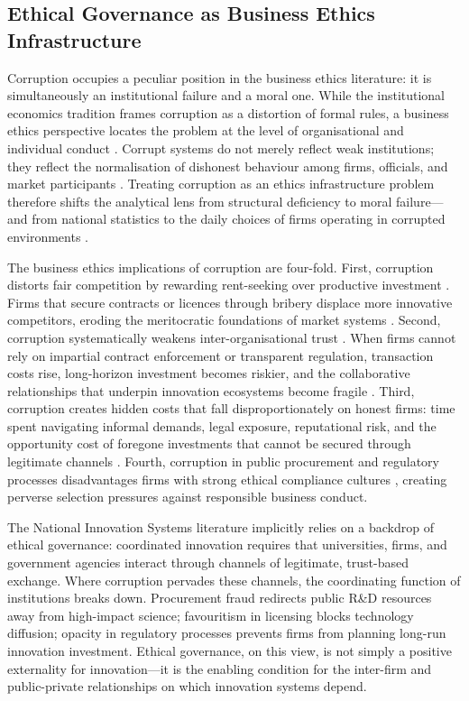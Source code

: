 \documentclass[pdflatex,sn-apa]{sn-jnl}
\begin{document}
\subsection{Ethical Governance as Business Ethics Infrastructure}

Corruption occupies a peculiar position in the business ethics literature: it is simultaneously an institutional failure and a moral one. While the institutional economics tradition \citep{north1990} frames corruption as a distortion of formal rules, a business ethics perspective locates the problem at the level of organisational and individual conduct \citep{freeman1984,donaldson1994}. Corrupt systems do not merely reflect weak institutions; they reflect the normalisation of dishonest behaviour among firms, officials, and market participants \citep{trevino2006,paine1994}. Treating corruption as an ethics infrastructure problem therefore shifts the analytical lens from structural deficiency to moral failure---and from national statistics to the daily choices of firms operating in corrupted environments \citep{argandona2001}.

The business ethics implications of corruption are four-fold. First, corruption distorts fair competition by rewarding rent-seeking over productive investment \citep{mauro1995,meon2005}. Firms that secure contracts or licences through bribery displace more innovative competitors, eroding the meritocratic foundations of market systems \citep{freeman1984,argandona2001}. Second, corruption systematically weakens inter-organisational trust \citep{north1990,scott2001}. When firms cannot rely on impartial contract enforcement or transparent regulation, transaction costs rise, long-horizon investment becomes riskier, and the collaborative relationships that underpin innovation ecosystems become fragile \citep{donaldson1994}. Third, corruption creates hidden costs that fall disproportionately on honest firms: time spent navigating informal demands, legal exposure, reputational risk, and the opportunity cost of foregone investments that cannot be secured through legitimate channels \citep{paine1994}. Fourth, corruption in public procurement and regulatory processes disadvantages firms with strong ethical compliance cultures \citep{trevino2006,kaptein2008}, creating perverse selection pressures against responsible business conduct.

The National Innovation Systems literature \citep{freeman1987,lundvall1992,nelson1993} implicitly relies on a backdrop of ethical governance: coordinated innovation requires that universities, firms, and government agencies interact through channels of legitimate, trust-based exchange. Where corruption pervades these channels, the coordinating function of institutions breaks down. Procurement fraud redirects public R\&D resources away from high-impact science; favouritism in licensing blocks technology diffusion; opacity in regulatory processes prevents firms from planning long-run innovation investment. Ethical governance, on this view, is not simply a positive externality for innovation---it is the enabling condition for the inter-firm and public-private relationships on which innovation systems depend.
\end{document}
